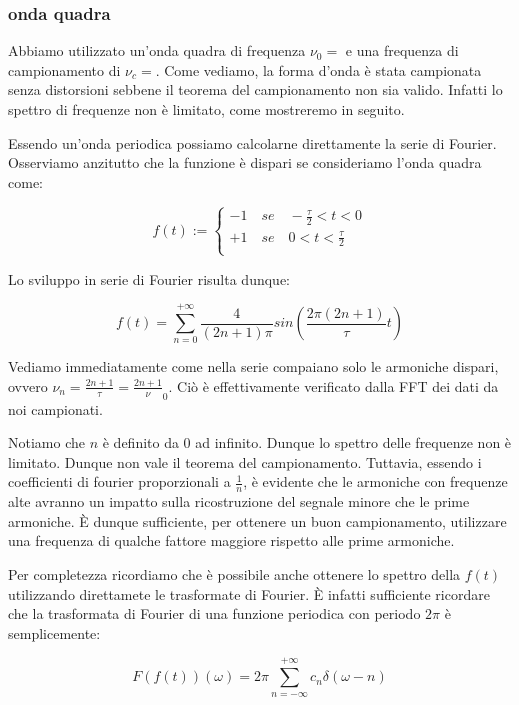 \subsubsection{onda quadra}
Abbiamo utilizzato un'onda quadra di frequenza $\nu_0=$ e una frequenza di campionamento di $\nu_c=$. Come vediamo, la forma d'onda è stata campionata senza distorsioni sebbene il teorema del campionamento non sia valido. Infatti lo spettro di frequenze non è limitato, come mostreremo in seguito.

Essendo un'onda periodica possiamo calcolarne direttamente la serie di Fourier. Osserviamo anzitutto che la funzione è dispari se consideriamo l'onda quadra come: 

\begin{displaymath}
f(t):=
\begin{cases}
-1 \quad se \quad -\frac{\tau}{2}<t<0 \\
+1 \quad se \quad 0<t<\frac{\tau}{2} \\ 
\end{cases}
\end{displaymath}

Lo sviluppo in serie di Fourier risulta dunque: 

\begin{equation}
f(t)=\sum_{n=0}^{+\infty}\frac{4}{(2n+1)\pi}sin (\frac{2\pi(2n+1)}{\tau}t)
\end{equation}

Vediamo immediatamente come nella serie compaiano solo le armoniche dispari, ovvero $\nu_n=\frac{2n+1}{\tau}=\frac{2n+1}\nu_0$. Ciò è effettivamente verificato dalla FFT dei dati da noi campionati.

Notiamo che $n$ è definito da 0 ad infinito. Dunque lo spettro delle frequenze non è limitato. Dunque non vale il teorema del campionamento. Tuttavia, essendo i coefficienti di fourier proporzionali a $\frac{1}{n}$, è evidente che le armoniche con frequenze alte avranno un impatto sulla ricostruzione del segnale minore che le prime armoniche. È dunque sufficiente, per ottenere un buon campionamento, utilizzare una frequenza di qualche fattore maggiore rispetto alle prime armoniche. 

Per completezza ricordiamo che è possibile anche ottenere lo spettro della $f(t)$ utilizzando direttamete le trasformate di Fourier. È infatti sufficiente ricordare che la trasformata di Fourier di una funzione periodica con periodo $2\pi$ è semplicemente:

$$F(f(t))(\omega)=2\pi \sum_{n=-\infty}^{+\infty} c_n \delta(\omega-n ) $$


